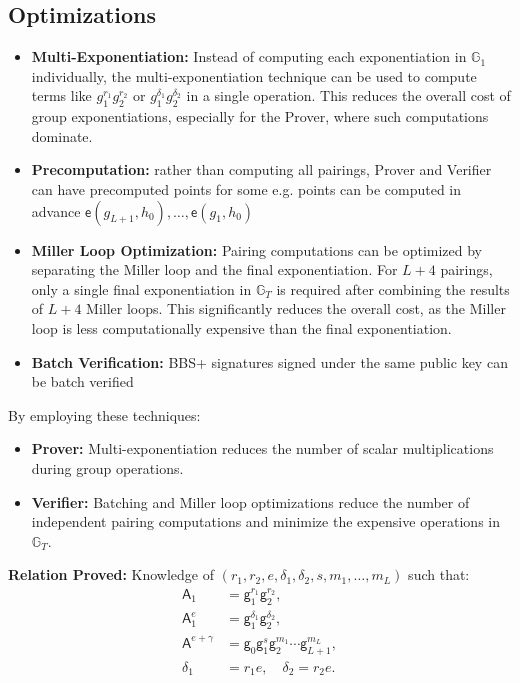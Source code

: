 {\subsection{Optimizations}

\begin{itemize}
    \item \textbf{Multi-Exponentiation:} Instead of computing each exponentiation in $\mathbb{G}_1$ individually, the multi-exponentiation technique can be used to compute terms like $g_1^{r_1} g_2^{r_2}$ or $g_1^{\delta_1} g_2^{\delta_2}$ in a single operation. This reduces the overall cost of group exponentiations, especially for the Prover, where such computations dominate.

    \item \textbf{Precomputation:} rather than computing all pairings, Prover and Verifier can have precomputed points for some e.g. points can be computed in advance $\mathsf{e}(g_{L+1}, h_0), \ldots, \mathsf{e}(g_1, h_0)$

    \item \textbf{Miller Loop Optimization:} Pairing computations can be optimized by separating the Miller loop and the final exponentiation. For $L+4$ pairings, only a single final exponentiation in $\mathbb{G}_T$ is required after combining the results of $L+4$ Miller loops. This significantly reduces the overall cost, as the Miller loop is less computationally expensive than the final exponentiation. 

    \item \textbf{Batch Verification: } BBS+ signatures signed under the same public key can be batch verified
\end{itemize}

By employing these techniques:
\begin{itemize}
    \item \textbf{Prover:} Multi-exponentiation reduces the number of scalar multiplications during group operations.
    \item \textbf{Verifier:} Batching and Miller loop optimizations reduce the number of independent pairing computations and minimize the expensive operations in $\mathbb{G}_T$.
\end{itemize}





\newpage
\noindent \textbf{Relation Proved:} Knowledge of $(r_1, r_2, e, \delta_1, \delta_2, s, m_1, \dots, m_L)$ such that:
\[
\begin{aligned}
\mathsf{A}_1 &= \mathsf{g}_1^{r_1} \mathsf{g}_2^{r_2}, \\
\mathsf{A}_1^e &= \mathsf{g}_1^{\delta_1} \mathsf{g}_2^{\delta_2}, \\
\mathsf{A}^{e+\gamma} &= \mathsf{g}_0 \mathsf{g}_1^s \mathsf{g}_2^{m_1} \cdots \mathsf{g}_{L+1}^{m_L}, \\
\delta_1 &= r_1 e, \quad \delta_2 = r_2 e.
\end{aligned}
\]

}
